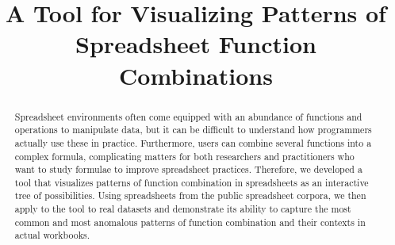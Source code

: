 \documentclass[conference]{IEEEtran}
\begin{document}
\title{A Tool for Visualizing Patterns of Spreadsheet Function Combinations}


\author{
}






\maketitle

\begin{abstract}
	Spreadsheet environments often come equipped with an abundance of functions and operations to manipulate data, but it can be difficult to understand how programmers actually use these in practice. Furthermore, users can combine several functions into a complex formula, complicating matters for both researchers and practitioners who want to study formulae to improve spreadsheet practices. Therefore, we developed a tool that visualizes patterns of function combination in spreadsheets as an interactive tree of possibilities. Using spreadsheets from the public spreadsheet corpora, we then apply to the tool to real datasets and demonstrate its ability to capture the most common and most anomalous patterns of function combination and their contexts in actual workbooks.
\end{abstract}
\end{document}
